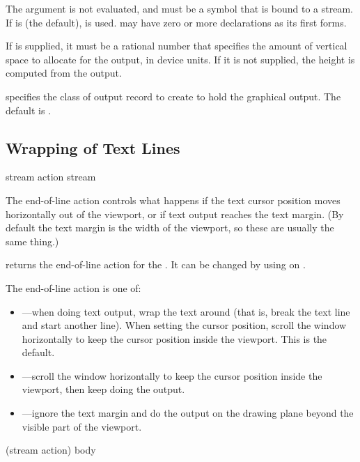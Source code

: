 The  argument is not evaluated, and must be a symbol that is bound
to a stream.  If  is  (the default),  is
used.   may have zero or more declarations as its first forms.

If  is supplied, it must be a rational number that specifies the
amount of vertical space to allocate for the output, in device units. If it is
not supplied, the height is computed from the output.

 specifies the class of output record to create to hold the
graphical output.  The default is .


\subsection {Wrapping of Text Lines}

 {stream}
 {action stream}

The end-of-line action controls what happens if the text cursor position moves
horizontally out of the viewport, or if text output reaches the text margin.
(By default the text margin is the width of the viewport, so these are usually
the same thing.)

 returns the end-of-line action for the
 .  It can be changed by using
 on .

The end-of-line action is one of: 

\begin{itemize}
\item {}---when doing text output, wrap the text around (that is, break
the text line and start another line).  When setting the cursor position, scroll
the window horizontally to keep the cursor position inside the viewport.  This
is the default.

\item {}---scroll the window horizontally to keep the cursor
position inside the viewport, then keep doing the output.

\item {}---ignore the text margin and do the output on the drawing
plane beyond the visible part of the viewport.
\end{itemize}

 {(stream action) \body body}

